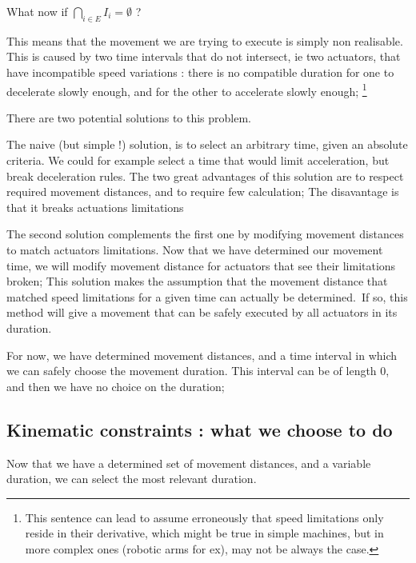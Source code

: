 What now if $\bigcap \limits _{i \in E} I_i = \emptyset$ ?\newline

This means that the movement we are trying to execute is simply non realisable. This is caused by two time
intervals that do not intersect, ie two actuators, that have incompatible speed variations : there is no compatible
duration for one to decelerate slowly enough, and for the other to accelerate slowly enough;
\footnote{This sentence can lead to assume erroneously that speed limitations only reside in their derivative,
which might be true in simple machines, but in more complex ones (robotic arms for ex), may not be always the
case.}\newline

There are two potential solutions to this problem.\newline

The naive (but simple !) solution, is to select an arbitrary time, given an absolute criteria. We could for example
select a time that would limit acceleration, but break deceleration rules. The two great advantages of this
solution are to respect required movement distances, and to require few calculation; The disavantage is that it
breaks actuations limitations\newline

The second solution complements the first one by modifying movement distances to match actuators limitations.
Now that we have determined our movement time, we will modify movement distance for actuators that see their
limitations broken; This solution makes the assumption that the movement distance that matched speed limitations
for a given time can actually be determined.\
    If so, this method will give a movement that can be safely executed by all actuators in its duration.\newline

For now, we have determined movement distances, and a time interval in which we can safely choose the movement
duration. This interval can be of length 0, and then we have no choice on the duration;\newline


\newpage

\subsection{Kinematic constraints : what we choose to do}

Now that we have a determined set of movement distances, and a variable duration, we can select the most relevant
duration.\newline

